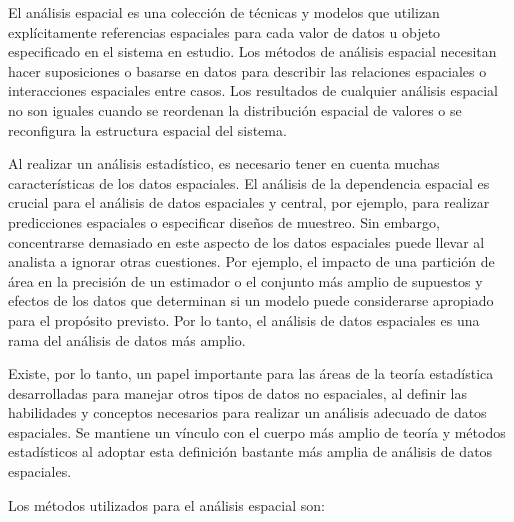 El análisis espacial es una colección de técnicas y modelos que utilizan explícitamente referencias espaciales para cada valor de datos u objeto especificado en el sistema en estudio. Los métodos de análisis espacial necesitan hacer suposiciones o basarse en datos para describir las relaciones espaciales o interacciones espaciales entre casos. Los resultados de cualquier análisis espacial no son iguales cuando se reordenan la distribución espacial de valores o se reconfigura la estructura espacial del sistema. \parencite{bk_haining2003spdat}

Al realizar un análisis estadístico, es necesario tener en cuenta muchas características de los datos espaciales. El análisis de la dependencia espacial es crucial para el análisis de datos espaciales y central, por ejemplo, para realizar predicciones espaciales o especificar diseños de muestreo. Sin embargo, concentrarse demasiado en este aspecto de los datos espaciales puede llevar al analista a ignorar otras cuestiones. Por ejemplo, el impacto de una partición de área en la precisión de un estimador o el conjunto más amplio de supuestos y efectos de los datos que determinan si un modelo puede considerarse apropiado para el propósito previsto. Por lo tanto, el análisis de datos espaciales es una rama del análisis de datos más amplio. \parencite{bk_haining2003spdat}

Existe, por lo tanto, un papel importante para las áreas de la teoría estadística desarrolladas para manejar otros tipos de datos no espaciales, al definir las habilidades y conceptos necesarios para realizar un análisis adecuado de datos espaciales. Se mantiene un vínculo con el cuerpo más amplio de teoría y métodos estadísticos al adoptar esta definición bastante más amplia de análisis de datos espaciales. \parencite{bk_haining2003spdat}

Los métodos utilizados para el análisis espacial son:

